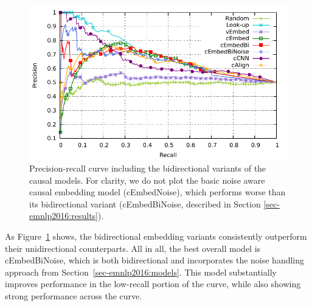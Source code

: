 \begin{figure}[th!]
\begin{center}
\includegraphics[width=\textwidth]{mainmatter/emnlp2016-causal/direct2.pdf} %
\caption{{Precision-recall curve including the bidirectional variants of the causal models. For clarity, we do not plot the basic noise aware causal embedding model (cEmbedNoise), which performs worse than its bidirectional variant (cEmbedBiNoise, described in Section \ref{sec-emnlp2016:results}). }}
\label{fig:rpcurve_withBi}
\end{center}
\end{figure}

As Figure~\ref{fig:rpcurve_withBi} shows, the bidirectional embedding variants consistently outperform their unidirectional counterparts. 
All in all, the best overall model is cEmbedBiNoise, which is both bidirectional and incorporates the noise handling approach from Section~\ref{sec-emnlp2016:models}. This model substantially improves performance in the low-recall portion of the curve, while also showing strong performance across the curve. 




